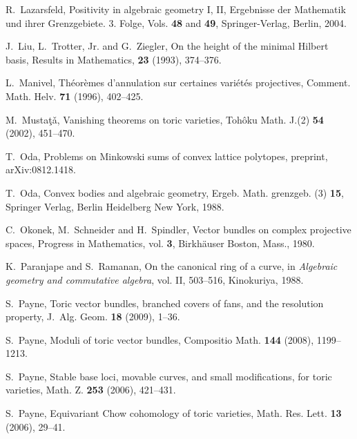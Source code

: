 \documentclass[12pt]{amsart}
\theoremstyle{definition}
\theoremstyle{remark}
\begin{document}
\begin{thebibliography}{BDPP}
  R.~Lazarsfeld,
Positivity in algebraic geometry I, II,
 Ergebnisse der Mathematik und ihrer Grenzgebiete. 3. Folge,
Vols. \textbf{48} and \textbf{49},
 Springer-Verlag, Berlin, 2004.
 
J.~Liu, L.~Trotter, Jr. and G.~Ziegler, 
        On the height of the minimal Hilbert basis,
Results in Mathematics, \textbf{23} (1993), 374--376. 

L.~Manivel, Th\'{e}or\`{e}mes d'annulation sur certaines
vari\'{e}t\'{e}s projectives,
 Comment. Math. Helv. \textbf{71} (1996), 402--425.

M.~Musta\c{t}\v{a}, Vanishing theorems on toric varieties,
Toh\^{o}ku Math. J.(2) \textbf{54} (2002), 451--470.

T.~Oda, Problems on Minkowski sums of convex lattice polytopes, preprint,
arXiv:0812.1418.

T.~Oda, Convex bodies and algebraic geometry, Ergeb. Math. grenzgeb.
(3) \textbf{15}, Springer Verlag, Berlin Heidelberg New York, 1988.

C.~Okonek, M.~Schneider and H.~Spindler, Vector bundles on complex
projective spaces, Progress in Mathematics, vol. \textbf{3},
Birkh\"{a}user Boston, Mass., 1980.

K.~Paranjape and S.~Ramanan, On the canonical ring of a curve, in
\emph{Algebraic geometry and commutative algebra}, vol. II,
503--516, Kinokuriya, 1988.

S.~Payne, Toric vector bundles, branched covers of fans, and the
resolution property,  J.~Alg. Geom.  \textbf{18} (2009), 1--36.

S.~Payne, Moduli of toric vector bundles, Compositio Math. \textbf{144} (2008), 
1199--1213.

S.~Payne, Stable base loci, movable curves, and small modifications,
for toric varieties,  Math. Z. \textbf{253} (2006), 421--431.

 S.~Payne, Equivariant Chow cohomology of toric varieties,  Math. Res. Lett.  \textbf{13}  (2006),  29--41.

\end{thebibliography}
\end{document}
